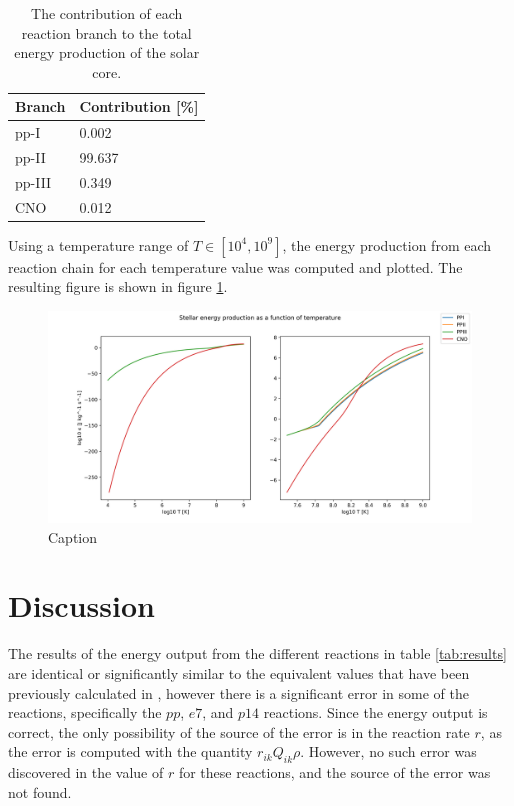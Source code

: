 \documentclass[a4paper,10pt,english]{article}
\begin{document}
\begin{table}[]\centering
\begin{tabular}{ll}
Branch   & Contribution {[}\%{]} \\ \hline
pp-I   & 0.002                 \\
pp-II  & 99.637                \\
pp-III & 0.349                 \\
CNO    & 0.012                 \\ \hline
\end{tabular}
\caption{The contribution of each reaction branch to the total energy production of the solar core.}
\label{tab:percent}
\end{table}

Using a temperature range of $T \in [10^4, 10^9]$, the energy production from each reaction chain for each temperature value was computed and plotted. The resulting figure is shown in figure \ref{fig:energy_temp}.

\begin{figure}
    \centering
    \includegraphics[width=1\textwidth]{energy_temperature.png}
    \caption{Caption}
    \label{fig:energy_temp}
\end{figure}

\section{Discussion}

The results of the energy output from the different reactions in table \ref{tab:results} are identical or significantly similar to the equivalent values that have been previously calculated in \cite{Gudiksen2015}, however there is a significant error in some of the reactions, specifically the $pp$, $e7$, and $p14$ reactions. Since the energy output is correct, the only possibility of the source of the error is in the reaction rate $r$, as the error is computed with the quantity $r_{ik}Q_{ik}\rho$. However, no such error was discovered in the value of $r$ for these reactions, and the source of the error was not found. 
\end{document}
